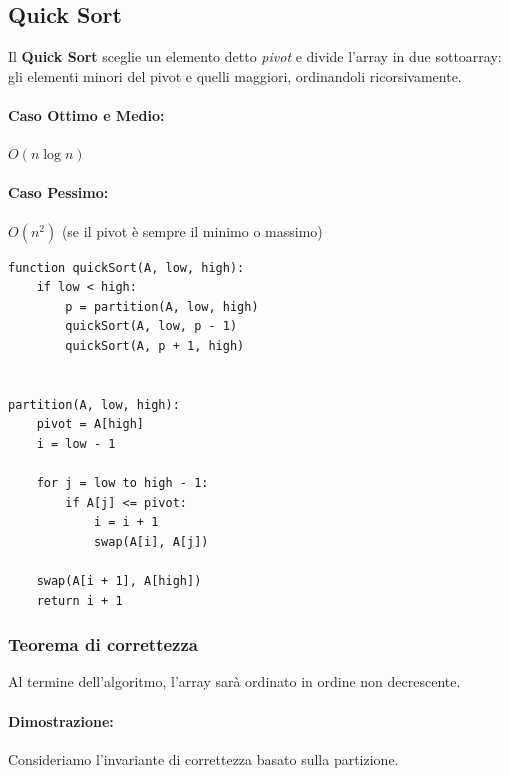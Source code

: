 \documentclass[a4paper,12pt]{article}
\begin{document}
\subsection{Quick Sort}
Il \textbf{Quick Sort} sceglie un elemento detto \textit{pivot} e divide l’array in due sottoarray:
gli elementi minori del pivot e quelli maggiori, ordinandoli ricorsivamente.

\paragraph{Caso Ottimo e Medio:} $O(n \log n)$\\
\paragraph{Caso Pessimo:} $O(n^2)$ (se il pivot è sempre il minimo o massimo)

\begin{lstlisting}
function quickSort(A, low, high):
    if low < high:
        p = partition(A, low, high)
        quickSort(A, low, p - 1)
        quickSort(A, p + 1, high)


partition(A, low, high):
    pivot = A[high]
    i = low - 1

    for j = low to high - 1:
        if A[j] <= pivot:
            i = i + 1
            swap(A[i], A[j])

    swap(A[i + 1], A[high])
    return i + 1
\end{lstlisting}
\subsubsection{Teorema di correttezza}
Al termine dell'algoritmo, l'array sarà ordinato in ordine non decrescente.
\paragraph{Dimostrazione:}
Consideriamo l'invariante di correttezza basato sulla partizione.
\end{document}
